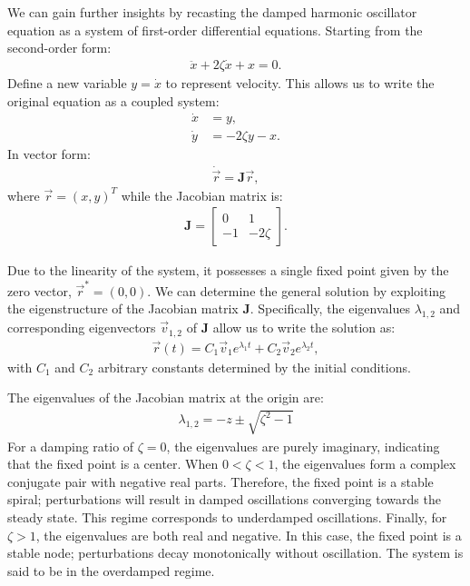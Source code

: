 We can gain further insights by recasting the damped harmonic oscillator equation as a system of first-order differential equations. Starting from the second-order form:
\begin{align}
\ddot{x} + 2\zeta \dot{x} + x = 0.
\end{align}
Define a new variable $y=\dot{x}$ to represent velocity. This allows us to write the original equation as a coupled system:
\begin{align}
\dot{x}&=y,\\
\dot{y}&=-2\zeta y - x.
\end{align}
In vector form:
\begin{align}
\dot{\vec{r}} = \mathbf{J}\vec{r},
\end{align}
where $\vec{r}=(x,y)^T$ while the Jacobian matrix is:
\begin{align*}
\mathbf{J}=\begin{bmatrix}
0&1\\
-1&-2\zeta
\end{bmatrix}.
\end{align*}
    
Due to the linearity of the system, it possesses a single fixed point given by the zero vector, $\vec{r}^* = (0,0)$. We can determine the general solution by exploiting the eigenstructure of the Jacobian matrix $\mathbf{J}$. Specifically, the eigenvalues $\lambda_{1,2}$ and corresponding eigenvectors $\vec{v}_{1,2}$ of $\mathbf{J}$ allow us to write the solution as:
\begin{align}
\vec{r}(t) = C_1 \vec{v}_1 e^{\lambda_1 t} + C_2 \vec{v}_2 e^{\lambda_2 t},
\end{align}
with $C_1$ and $C_2$ arbitrary constants determined by the initial conditions. 

The eigenvalues of the Jacobian matrix at the origin are:
\begin{align}
\lambda_{1,2} = -z \pm \sqrt{\zeta^2-1}
\end{align}
For a damping ratio of $\zeta=0$, the eigenvalues are purely imaginary, indicating that the fixed point is a center. When $0<\zeta<1$, the eigenvalues form a complex conjugate pair with negative real parts. Therefore, the fixed point is a stable spiral; perturbations will result in damped oscillations converging towards the steady state. This regime corresponds to underdamped oscillations. Finally, for $\zeta>1$, the eigenvalues are both real and negative. In this case, the fixed point is a stable node; perturbations decay monotonically without oscillation. The system is said to be in the overdamped regime.

